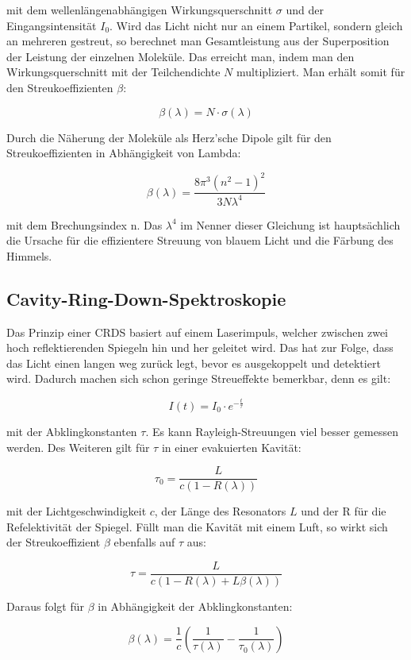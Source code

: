 mit dem wellenlängenabhängigen Wirkungsquerschnitt $\sigma$ und der Eingangsintensität $I_0$. Wird das Licht nicht nur an einem Partikel, sondern gleich an mehreren gestreut, so berechnet man Gesamtleistung aus der Superposition der Leistung der einzelnen Moleküle. Das erreicht man, indem man den Wirkungsquerschnitt mit der Teilchendichte $N$ multipliziert. Man erhält somit für den Streukoeffizienten $\beta$:

\begin{equation}
\beta(\lambda)= N \cdot \sigma(\lambda)
\end{equation}

Durch die Näherung der Moleküle als Herz'sche Dipole gilt für den Streukoeffizienten in Abhängigkeit von Lambda:

\begin{equation}
\beta(\lambda)= \frac{8\pi^3(n^2-1)^2}{3N\lambda^4}
\end{equation}

mit dem Brechungsindex n. Das $\lambda^4$ im Nenner dieser Gleichung ist hauptsächlich die Ursache für die effizientere Streuung von blauem Licht und die Färbung des Himmels. 

\subsection{Cavity-Ring-Down-Spektroskopie}
Das Prinzip einer CRDS basiert auf einem Laserimpuls, welcher zwischen zwei hoch reflektierenden Spiegeln hin und her geleitet wird. Das hat zur Folge, dass das Licht einen langen weg zurück legt, bevor es ausgekoppelt und detektiert wird. Dadurch machen sich schon geringe Streueffekte bemerkbar, denn es gilt:

\begin{equation}
I(t)=I_0 \cdot e^{-\frac{t}{\tau}}
\end{equation}

mit der Abklingkonstanten $\tau$. Es kann Rayleigh-Streuungen viel besser gemessen werden. Des Weiteren gilt für $\tau$ in einer evakuierten Kavität:

\begin{equation}
\tau_{0}=\frac{L}{c(1-R(\lambda))}
\end{equation}

mit der Lichtgeschwindigkeit $c$, der Länge des Resonators $L$ und der R für die Refelektivität der Spiegel. Füllt man die Kavität mit einem Luft, so wirkt sich der Streukoeffizient $\beta$ ebenfalls auf $\tau$ aus:

\begin{equation}
\tau= \frac{L}{c(1-R(\lambda)+L\beta(\lambda))}
\end{equation}

Daraus folgt für $\beta$ in Abhängigkeit der Abklingkonstanten:

\begin{equation}
\beta(\lambda)=\frac{1}{c}\left(\frac{1}{\tau(\lambda)}-\frac{1}{\tau_0(\lambda)}\right)
\end{equation}
